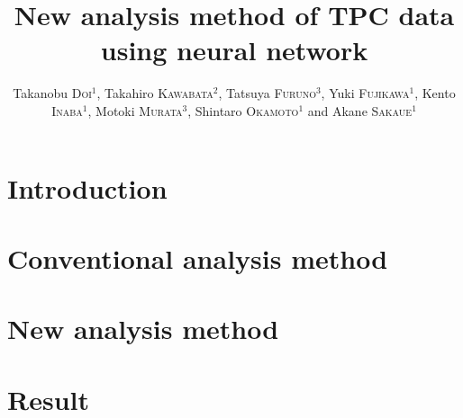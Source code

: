 \documentclass{jps-cp}
\title{New analysis method of TPC data using neural network}
\author{
  Takanobu \textsc{Doi}$^{1}$, Takahiro \textsc{Kawabata}$^{2}$, Tatsuya \textsc{Furuno}$^{3}$,
  Yuki \textsc{Fujikawa}$^{1}$, Kento \textsc{Inaba}$^{1}$, Motoki \textsc{Murata}$^{3}$,
  Shintaro \textsc{Okamoto}$^{1}$ and Akane \textsc{Sakaue}$^{1}$}
\begin{document}
\maketitle

\section{Introduction}

\section{Conventional analysis method}

\section{New analysis method}

\section{Result}
\end{document}
